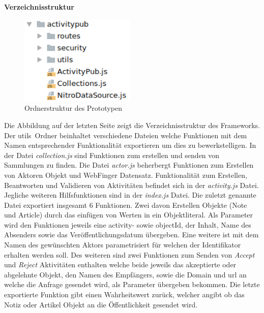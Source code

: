 \begingroup
	\fontsize{18pt}{12pt}\selectfont
	\textbf{Verzeichnisstruktur}
	\vspace{4pt}
\endgroup\\
\begin{figure}[H]
	\centering
	\includegraphics[width=5.5cm]{figures/activitypub-directory-structur.png}
	\caption{Ordnerstruktur des Prototypen}
	\label{fig:directory-structur}
\end{figure}
Die Abbildung auf der letzten Seite zeigt die Verzeichnisstruktur des Frameworks. Der \glqq utils\grqq~Ordner beinhaltet verschiedene Dateien welche Funktionen mit dem Namen entsprechender Funktionalität exportieren um dies zu bewerkstelligen. In der Datei \textit{collection.js} sind Funktionen zum erstellen und senden von Sammlungen zu finden. Die Datei \textit{actor.js} beherbergt Funktionen zum Erstellen von Aktoren Objekt und WebFinger Datensatz. Funktionalität zum Erstellen, Beantworten und Validieren von Aktivitäten befindet sich in der \textit{activity.js} Datei. Jegliche weiteren Hilfsfunktionen sind in der \textit{index.js} Datei. Die zuletzt genannte Datei exportiert insgesamt 6 Funktionen. Zwei davon Erstellen Objekte (Note und Article) durch das einfügen von Werten in ein Objektliteral. Als Parameter wird den Funktionen jeweils eine activity- sowie objectId, der Inhalt, Name des Absenders sowie das Veröffentlichungsdatum übergeben. Eine weitere ist mit dem Namen des gewünschten Aktors parametrisiert für welchen der Identifikator erhalten werden soll. Des weiteren sind zwei Funktionen zum Senden von \textit{Accept} und \textit{Reject} Aktivitäten enthalten welche beide jeweils das akzeptierte oder abgelehnte Objekt, den Namen des Empfängers, sowie die Domain und \gls{url} an welche die Anfrage gesendet wird, als Parameter übergeben bekommen. Die letzte exportierte Funktion gibt einen Wahrheitswert zurück, welcher angibt ob das Notiz oder Artikel Objekt an die Öffentlichkeit gesendet wird.\\
